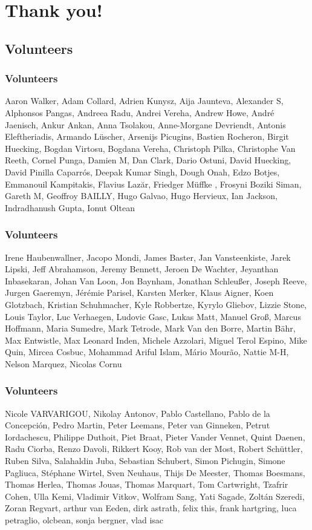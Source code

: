 \documentclass[t]{beamer}
\begin{document}
\section{Thank you!}

\subsection{Volunteers}

\begin{frame}
	\frametitle{Volunteers}
	Aaron Walker, Adam Collard, Adrien Kunysz, Aija Jaunteva, Alexander S, Alphonsos Pangas, Andreea Radu, Andrei Vereha, Andrew Howe, André Jaenisch, Ankur Ankan, Anna Tsolakou, Anne-Morgane Devriendt, Antonis Eleftheriadis, Armando Lüscher, Arsenijs Picugins, Bastien Rocheron, Birgit Huecking, Bogdan Virtosu, Bogdana Vereha, Christoph Pilka, Christophe Van Reeth, Cornel Punga, Damien M, Dan Clark, Dario Ostuni, David Huecking, David Pinilla Caparrós, Deepak Kumar Singh, Dough Onah, Edzo Botjes, Emmanouil Kampitakis, Flavius Lazăr, Friedger  Müffke , Frosyni Boziki Siman, Gareth M, Geoffroy BAILLY, Hugo Galvao, Hugo Hervieux, Ian Jackson, Indradhanush Gupta, Ionut Oltean
\end{frame}

\begin{frame}
	\frametitle{Volunteers}
	Irene Haubenwallner, Jacopo Mondi, James Baster, Jan Vansteenkiste, Jarek Lipski, Jeff Abrahamson, Jeremy Bennett, Jeroen De Wachter, Jeyanthan Inbasekaran, Johan Van Loon, Jon Baynham, Jonathan Schleußer, Joseph Reeve, Jurgen Gaeremyn, Jérémie Parisel, Karsten Merker, Klaus Aigner, Koen Glotzbach, Kristian Schuhmacher, Kyle Robbertze, Kyrylo Gliebov, Lizzie Stone, Louis Taylor, Luc Verhaegen, Ludovic Gasc, Lukas Matt, Manuel Groß, Marcus Hoffmann, Maria Sumedre, Mark Tetrode, Mark Van den Borre, Martin Bähr, Max Entwistle, Max Leonard Inden, Michele Azzolari, Miguel Terol Espino, Mike Quin, Mircea Cosbuc, Mohammad Ariful Islam, Mário Mourão, Nattie M-H, Nelson Marquez, Nicolas Cornu
\end{frame}

\begin{frame}
	\frametitle{Volunteers}
	 Nicole VARVARIGOU, Nikolay Antonov, Pablo Castellano, Pablo de la Concepción, Pedro Martin, Peter Leemans, Peter van Ginneken, Petrut Iordachescu, Philippe Duthoit, Piet Braat, Pieter Vander Vennet, Quint Daenen, Radu Ciorba, Renzo Davoli, Rikkert Kooy, Rob van der Most, Robert Schüttler, Ruben Silva, Salahaldin Juba, Sebastian Schubert, Simon Pichugin, Simone Pagliuca, Stéphane Wirtel, Sven Neuhaus, Thijs De Meester, Thomas Boesmans, Thomas Herlea, Thomas Jouas, Thomas Marquart, Tom Cartwright, Tzafrir Cohen, Ulla Kemi, Vladimir Vitkov, Wolfram Sang, Yati Sagade, Zoltán Szeredi, Zoran Regvart, arthur van Eeden, dirk astrath, felix this, frank hartgring, luca petraglio, olcbean, sonja bergner, vlad isac
\end{frame}
\end{document}
